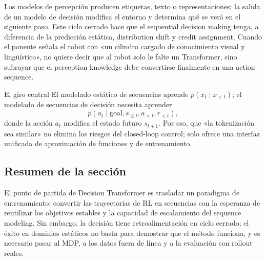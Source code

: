 Los modelos de percepción producen etiquetas, texto o representaciones; la salida de un modelo de decisión modifica el entorno y determina qué se verá en el siguiente paso. Este ciclo cerrado hace que el sequential decision making tenga, a diferencia de la predicción estática, distribution shift y credit assignment. Cuando el ponente señala el robot con «un cilindro cargado de conocimiento visual y lingüístico», no quiere decir que al robot solo le falte un Transformer, sino subrayar que el perception knowledge debe convertirse finalmente en una action sequence.


\begin{importantbox}{El giro central}
El modelado estático de secuencias aprende $p(x_t\mid x_{<t})$; el modelado de secuencias de decisión necesita aprender
\[
p(a_t\mid \text{goal},s_{\le t},a_{<t},r_{<t}),
\]
donde la acción $a_t$ modifica el estado futuro $s_{t+1}$. Por eso, que «la tokenización sea similar» no elimina los riesgos del closed-loop control; solo ofrece una interfaz unificada de aproximación de funciones y de entrenamiento.
\end{importantbox}

\subsection{Resumen de la sección}

El punto de partida de Decision Transformer es trasladar un paradigma de entrenamiento: convertir las trayectorias de RL en secuencias con la esperanza de reutilizar los objetivos estables y la capacidad de escalamiento del sequence modeling. Sin embargo, la decisión tiene retroalimentación en ciclo cerrado; el éxito en dominios estáticos no basta para demostrar que el método funciona, y es necesario pasar al MDP, a los datos fuera de línea y a la evaluación con rollout reales.
